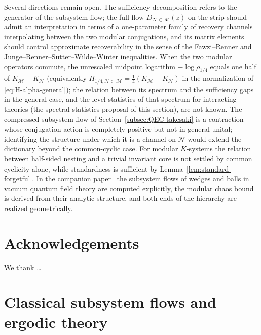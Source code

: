 \documentclass[a4paper,11pt]{article}
\theoremstyle{definition}
\newcommand{\mN}{\mathcal{N}}
\newcommand{\mM}{\mathcal{M}}
\begin{document}
Several directions remain open. The sufficiency decomposition refers to the generator of the subsystem flow; the full flow $D_{\mN\subset\mM}(z)$ on the strip should admit an interpretation in terms of a one-parameter family of recovery channels interpolating between the two modular conjugations, and its matrix elements should control approximate recoverability in the sense of the Fawzi--Renner and Junge--Renner--Sutter--Wilde--Winter inequalities. When the two modular operators commute, the unrescaled midpoint logarithm $-\log\rho_{1/4}$ equals one half of $K_{\mM}-K_{\mN}$ (equivalently $H_{1/4,\mN\subset\mM}=\tfrac14(K_{\mM}-K_{\mN})$ in the normalization of \eqref{eq:H-alpha-general}); the relation between its spectrum and the sufficiency gaps in the general case, and the level statistics of that spectrum for interacting theories (the spectral-statistics proposal of this section), are not known. The compressed subsystem flow of Section~\ref{subsec:QEC-takesaki} is a contraction whose conjugation action is completely positive but not in general unital; identifying the structure under which it is a channel on $\mN$ would extend the dictionary beyond the common-cyclic case. For modular $K$-systems the relation between half-sided nesting and a trivial invariant core is not settled by common cyclicity alone, while standardness is sufficient by Lemma~\ref{lem:standard-forgetful}. In the companion paper~\cite{companionQFT} the subsystem flows of wedges and balls in vacuum quantum field theory are computed explicitly, the modular chaos bound is derived from their analytic structure, and both ends of the hierarchy are realized geometrically.

\section*{Acknowledgements}
We thank \ldots

\appendix



\section{Classical subsystem flows and ergodic theory}\label{sec:classical}
\end{document}
